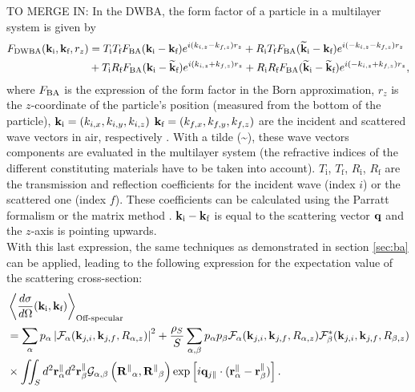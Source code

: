 TO MERGE IN:
In the DWBA, the form factor of a particle in a multilayer system is given by
\begin{align}
F_{\rm{DWBA}} (\mathbf{k}_\text{i},\mathbf{k}_\text{f}, r_z) & = T_\text{i} T_\text{f} F_{\rm{BA}} (\mathbf{k}_\text{i}-\mathbf{k}_\text{f}) e^{i (k_{i,z}-k_{f,z}) r_z} + R_\text{i} T_\text{f} F_{\rm{BA}}(\mathbf{\widetilde{k}}_\text{i}-\mathbf{k}_\text{f}) e^{i(-k_{i,z}-k_{f,z})r_z}
 \nonumber \\
  &+ T_\text{i} R_\text{f} F_{\rm{BA}}(\mathbf{k}_\text{i}-\mathbf{\widetilde{k}}_\text{f})e^{i(k_{i,z}+k_{f,z})r_z} + R_\text{i}R_\text{f}F_{\rm{BA}} (\mathbf{\widetilde{k}}_\text{i}-\mathbf{\widetilde{k}}_\text{f})e^{i(-k_{i,z}+k_{f,z})r_z}, \label{Edwbageneral}
\end{align}
where $F_{\rm{BA}}$ is the expression of the form factor in the Born approximation, $r_z$ is the $z$-coordinate of the particle's position (measured from the bottom of the particle), $\mathbf{k}_\text{i}=(k_{i,x}, k_{i,y}, k_{i,z})$ $\mathbf{k}_\text{f}=(k_{f,x}, k_{f,y}, k_{f,z})$ are the incident and scattered wave vectors in air, respectively \cite{RaSS95}.
With a tilde (\~{}), these wave vectors components are evaluated in the multilayer system (the refractive indices of the different constituting materials have to be taken into account). 
$T_\text{i}$, $T_\text{f}$, $R_\text{i}$, $R_\text{f}$ are the transmission and reflection coefficients for the incident wave (index $i$) or the scattered one (index $f$). These coefficients can be calculated using the Parratt formalism \cite{Par54} or the matrix method \cite{BoWo99}. $\mathbf{k}_\text{i}-\mathbf{k}_\text{f}$ is equal to the scattering vector $\mathbf{q}$ and the $z$-axis is pointing upwards.\\

With this last expression, the same techniques as demonstrated in section \ref{sec:ba} can be applied, leading to the following expression for the expectation value of the scattering cross-section:
\begin{align*}
  & \left\langle \frac{d\sigma}{d\Omega}(\mathbf{k}_\text{i},\mathbf{k}_\text{f}) \right\rangle_{\text{Off-specular}}  \\
  & = \sum_\alpha p_\alpha \left\lvert \mathcal{F}_\alpha(\mathbf{k}_{j,i},\mathbf{k}_{j,f}, R_{\alpha,z})\right\rvert ^2 + \frac{\rho_S}{S}\sum_{\alpha,\beta} p_\alpha p_\beta \mathcal{F}_\alpha (\mathbf{k}_{j,i},\mathbf{k}_{j,f}, R_{\alpha,z})\mathcal{F}_\beta^*(\mathbf{k}_{j,i},\mathbf{k}_{j,f}, R_{\beta,z}) \\
  & \times \iint_S d^2\mathbf{r}_\alpha^\parallel d^2\mathbf{r}_\beta^\parallel \mathcal{G}_{\alpha ,\beta}\left( \mathbf{R^\parallel}_{\alpha} , \mathbf{R^\parallel}_{\beta} \right) \exp \left[ i\mathbf{q}_{j\parallel}\cdot (\mathbf{r}_\alpha^\parallel - \mathbf{r}_\beta^\parallel ) \right].
\end{align*}

